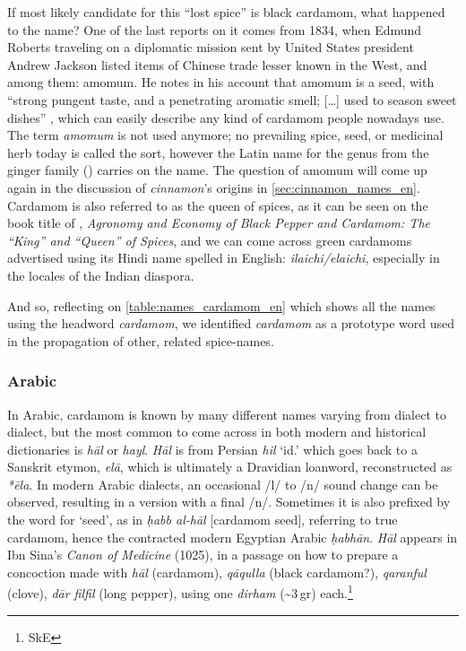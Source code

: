 If most likely candidate for this ``lost spice'' is black cardamom, what happened to the name? One of the last reports on it comes from 1834, when Edmund Roberts traveling on a diplomatic mission sent by United States president Andrew Jackson listed items of Chinese trade lesser known in the West, and among them: amomum. He notes in his account that amomum is a seed, with ``strong pungent taste, and a penetrating aromatic smell; […] used to season sweet dishes'' \parencite[135]{roberts_embassy_1837}, which can easily describe any kind of cardamom people nowadays use. The term \textit{amomum} is not used anymore; no prevailing spice, seed, or medicinal herb today is called the sort, however the Latin name for the genus  from the ginger family () carries on the name. The question of amomum will come up again in the discussion of \textit{cinnamon}'s origins in \cref{sec:cinnamon_names_en}. Cardamom is also referred to as the queen of spices, as it can be seen on the book title of \textcite{nair_agronomy_2011}, \textit{Agronomy and Economy
of Black Pepper and Cardamom: The ``King'' and ``Queen'' of Spices}, and we can come across green cardamoms advertised using its Hindi name spelled in English: \textit{ilaichi/elaichi}, especially in the locales of the Indian diaspora.

And so, reflecting on \cref{table:names_cardamom_en} which shows all the names using the headword \textit{cardamom}, we identified \textit{cardamom} as a prototype word used in the propagation of other, related spice-names.

\subsubsection{Arabic}



In Arabic, cardamom is known by many different names varying from dialect to dialect, but the most common to come across in both modern and historical dictionaries is  \textit{hāl} or \textit{hayl}.
\textit{Hāl} is from Persian  \textit{hil} `id.' which goes back to a Sanskrit etymon,   \textit{elā}, which is ultimately a Dravidian loanword, reconstructed as \textit{*ēla}. In modern Arabic dialects, an occasional /l/ to /n/ sound change can be observed, resulting in a version with a final /n/. Sometimes it is also prefixed by the word for `seed', as in \textit{ḥabb al-hāl} [cardamom seed], referring to true cardamom, hence the contracted modern Egyptian Arabic \textit{ḥabhān}. \textit{Hāl} appears in Ibn Sina's \textit{Canon of Medicine} (1025), in a passage on how to prepare a concoction made with \textit{hāl} (cardamom), \textit{qāqulla} (black cardamom?), \textit{qaranful} (clove), \textit{dār filfil} (long pepper), using one \textit{dirham} (\textasciitilde 3\,gr) each.\footnote{SkE}

